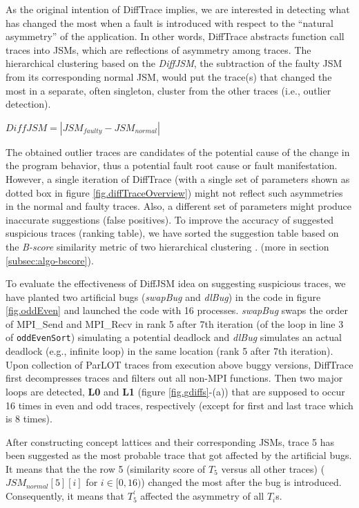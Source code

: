 As the original intention of DiffTrace implies, we are interested in detecting what has changed the most when a fault is introduced with respect to the ``natural asymmetry'' of the application.
%
In other words, DiffTrace abstracts function call traces into JSMs, which are reflections of asymmetry among traces. The hierarchical clustering based on the \textit{DiffJSM}, the subtraction of the faulty JSM from its corresponding normal JSM, would put the trace(s) that changed the most in a separate, often singleton, cluster from the other traces (i.e., outlier detection).

$DiffJSM = |JSM_{faulty} - JSM_{normal}|$

% 
The obtained outlier traces are candidates of the potential cause of the change in the program behavior, thus a potential fault root cause or fault manifestation.
%
However, a single iteration of DiffTrace (with a single set of parameters shown as dotted box in figure \ref{fig.diffTraceOverview}) might not reflect such asymmetries in the normal and faulty traces. 
%
Also, a different set of parameters might produce inaccurate suggestions (false positives).
%
To improve the accuracy of suggested suspicious traces (ranking table), we have sorted the suggestion table based on the \textit{B-score} similarity metric of two hierarchical clustering \cite{fowlkes83}. (more in section \ref{subsec:algo-bscore}).

To evaluate the effectiveness of DiffJSM idea on suggesting suspicious traces, we have planted two artificial bugs (\textit{swapBug} and \textit{dlBug}) in the code in figure \ref{fig.oddEven} and launched the code with 16 processes. 
%
\textit{swapBug} swaps the order of MPI\_Send and MPI\_Recv in rank 5 after 7th iteration (of the loop in line 3 of \texttt{oddEvenSort}) simulating a potential deadlock and \textit{dlBug} simulates an actual deadlock (e.g., infinite loop) in the same location (rank 5 after 7th iteration).
%
Upon collection of ParLOT traces from execution above buggy versions, DiffTrace first decompresses traces and filters out all non-MPI functions.
Then two major loops are detected, \textbf{L0} and \textbf{L1}  (figure \ref{fig.gdiffs}-(a)) that are supposed to occur 16 times in even and odd traces, respectively (except for first and last trace which is 8 times).

After constructing concept lattices and their corresponding JSMs, trace 5 has been suggested as the most probable trace that got affected by the artificial bugs. It means that the the row 5 (similarity score of $T_5$ versus all other traces) ($JSM_{normal}[5][i]$ for $i \in [0,16)$) changed the most after the bug is introduced. Consequently, it means that $T^\prime_5$ affected the asymmetry of all $T_i$s.


